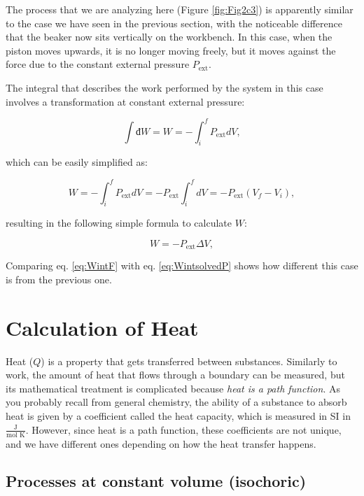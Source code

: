 \documentclass[
  9pt,
]{extbook}
\theoremstyle{definition}
\theoremstyle{definition}
\theoremstyle{definition}
\theoremstyle{remark}
\begin{document}
The process that we are analyzing here (Figure \ref{fig:Fig2c3}) is apparently similar to the case we have seen in the previous section, with the noticeable difference that the beaker now sits vertically on the workbench. In this case, when the piston moves upwards, it is no longer moving freely, but it moves against the force due to the constant external pressure \(P_{\text{ext}}\).

The integral that describes the work performed by the system in this case involves a transformation at constant external pressure:

\begin{equation}
  \int đ W = W = - \int_{i}^{f} P_{\text{ext}}dV,
  \label{eq:Wint2}
\end{equation}

which can be easily simplified as:

\begin{equation}
  W = - \int_{i}^{f} P_{\text{ext}}dV = -P_{\text{ext}} \int_{i}^{f} dV = -P_{\text{ext}} (V_f-V_i),
  \label{eq:Wint3}
\end{equation}

resulting in the following simple formula to calculate \(W\):

\begin{equation}
  W = -P_{\text{ext}} \Delta V,
  \label{eq:WintF}
\end{equation}

Comparing eq. \eqref{eq:WintF} with eq. \eqref{eq:WintsolvedP} shows how different this case is from the previous one.

\hypertarget{heatint}{%
\section{Calculation of Heat}\label{heatint}}

Heat (\(Q\)) is a property that gets transferred between substances. Similarly to work, the amount of heat that flows through a boundary can be measured, but its mathematical treatment is complicated because \emph{heat is a path function}.
As you probably recall from general chemistry, the ability of a substance to absorb heat is given by a coefficient called the heat capacity, which is measured in SI in \(\frac{\text{J}}{\text{mol K}}\). However, since heat is a path function, these coefficients are not unique, and we have different ones depending on how the heat transfer happens.

\hypertarget{processes-at-constant-volume-isochoric}{%
\subsection{Processes at constant volume (isochoric)}\label{processes-at-constant-volume-isochoric}}
\end{document}
